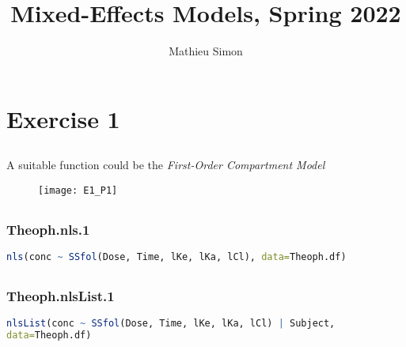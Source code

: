 \documentclass[a4paper,12pt]{article}
\begin{document}
	
	\title{Mixed-Effects Models, Spring 2022}
	\author{Mathieu Simon}
	\maketitle
	
	\setlength{\parskip}{1em}
	
	\section{Exercise 1}
	
	\subsection{}
	
	A suitable function could be the \textit{First-Order Compartment Model}
	\begin{figure}[h!]
		\centering
		\texttt{[image: E1\_P1]}
	\end{figure}

	\newpage
	\subsection{}
	
	\subsubsection*{Theoph.nls.1}
	\begin{lstlisting}[language=R]
nls(conc ~ SSfol(Dose, Time, lKe, lKa, lCl), data=Theoph.df)
	\end{lstlisting}
	
	\subsection{}

	\subsubsection*{Theoph.nlsList.1}
	\begin{lstlisting}[language=R]
nlsList(conc ~ SSfol(Dose, Time, lKe, lKa, lCl) | Subject,
data=Theoph.df)
	\end{lstlisting}
	
	\subsection{}
\end{document}

